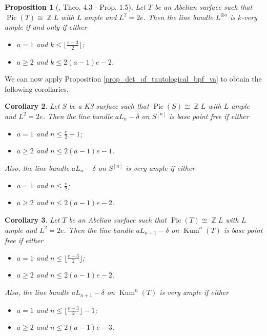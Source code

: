 \documentclass{article}
\DeclareMathOperator{\bZ}{\mathbb{Z}}
\DeclareMathOperator{\Pic}{Pic}
\DeclareMathOperator{\Kum}{Kum}
\newcommand{\hilb}[2][n]{#2^{[#1]}}
\newtheorem{proposition}{Proposition}[section]
\newtheorem{corollary}[proposition]{Corollary}
\begin{document}
\begin{proposition}[\cite{Alagal_2016}, Theo. 4.3 - Prop. 1.5]\label{prop_k_very_ample_abelian}
Let $T$ be an Abelian surface such that $\Pic(T)\cong\bZ L$ with $L$ ample and $L^2=2e$. Then the line bundle $L^{\otimes a}$ is $k$-very ample if and only if either
\begin{itemize}
    \item $a=1$ and $k\leq \lfloor\frac{e-3}{2}\rfloor$;
    \item $a\geq 2$ and $k\leq 2(a-1)e-2$.
\end{itemize}
\end{proposition}

We can now apply Proposition \ref{prop_det_of_tautological_bpf_va} to obtain the following corollaries.

\begin{corollary}\label{cor_bpf_va_line_bundle_for_k3}
Let $S$ be a K3 surface such that $\Pic(S)\cong\bZ L$ with $L$ ample and $L^2=2e$. Then the line bundle $aL_n-\delta$ on $\hilb{S}$ is base point free if either
\begin{itemize}
    \item $a=1$ and $n\leq \frac{e}{2}+1$;
    \item $a\geq 2$ and $n\leq 2(a-1)e-1$.
\end{itemize}
Also, the line bundle $aL_n-\delta$ on $\hilb{S}$ is very ample if either
\begin{itemize}
    \item $a=1$ and $n\leq \frac{e}{2}$;
    \item $a\geq 2$ and $n\leq 2(a-1)e-2$.
\end{itemize}
\end{corollary}

\begin{corollary}\label{cor_bpf_va_line_bundle_for_abelian}
Let $T$ be an Abelian surface such that $\Pic(T)\cong\bZ L$ with $L$ ample and $L^2=2e$. Then the line bundle $aL_{n+1}-\delta$ on $\Kum^n(T)$ is base point free if either
\begin{itemize}
    \item $a=1$ and $n\leq \lfloor\frac{e-3}{2}\rfloor$;
    \item $a\geq 2$ and $n\leq 2(a-1)e-2$.
\end{itemize}
Also, the line bundle $aL_{n+1}-\delta$ on $\Kum^n(T)$ is very ample if either
\begin{itemize}
    \item $a=1$ and $n\leq \lfloor\frac{e-3}{2}\rfloor-1$;
    \item $a\geq 2$ and $n\leq 2(a-1)e-3$.
\end{itemize}
\end{corollary}
\end{document}

